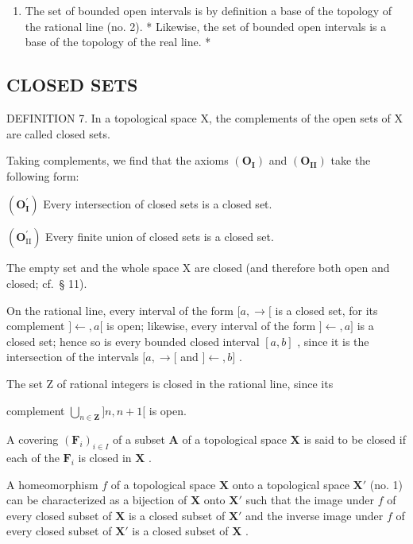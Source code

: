 \begin{enumerate}
\def\labelenumi{\arabic{enumi})}
\setcounter{enumi}{1}
\tightlist
\item
  The set of bounded open intervals is by definition a base of the topology of the rational line (no. 2). * Likewise, the set of bounded open intervals is a base of the topology of the real line. *
\end{enumerate}

\subsection{CLOSED SETS}

DEFINITION 7. In a topological space X, the complements of the open sets of X are called closed sets.

Taking complements, we find that the axioms \((\mathbf{O}_{\mathbf{I}})\) and \((\mathbf{O}_{\mathbf{II}})\) take the following form:

\((\mathbf{O}_{\mathbf{I}}^{\prime})\) Every intersection of closed sets is a closed set.

\((\mathbf{O}_{\mathrm{II}}^{\prime})\) Every finite union of closed sets is a closed set.

The empty set and the whole space X are closed (and therefore both open and closed; cf.~§ 11).

On the rational line, every interval of the form \([a, \rightarrow[\) is a closed set, for its complement \(]\leftarrow, a[\) is open; likewise, every interval of the form \(]\leftarrow, a]\) is a closed set; hence so is every bounded closed interval \([a, b]\) , since it is the intersection of the intervals \([a, \rightarrow[\) and \(]\leftarrow, b]\) .

The set Z of rational integers is closed in the rational line, since its

complement \(\bigcup_{n\in \mathbf{Z}}]n,n + 1[\) is open.

A covering \((\mathbf{F}_i)_{i\in I}\) of a subset \(\mathbf{A}\) of a topological space \(\mathbf{X}\) is said to be closed if each of the \(\mathbf{F}_i\) is closed in \(\mathbf{X}\) .

A homeomorphism \(f\) of a topological space \(\mathbf{X}\) onto a topological space \(\mathbf{X}'\) (no. 1) can be characterized as a bijection of \(\mathbf{X}\) onto \(\mathbf{X}'\) such that the image under \(f\) of every closed subset of \(\mathbf{X}\) is a closed subset of \(\mathbf{X}'\) and the inverse image under \(f\) of every closed subset of \(\mathbf{X}'\) is a closed subset of \(\mathbf{X}\) .

